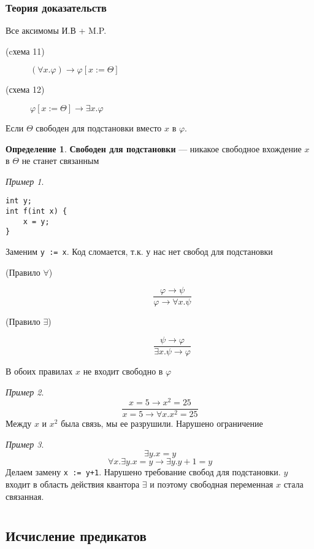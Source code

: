 \documentclass[oneside]{book}
\theoremstyle{plain}
\theoremstyle{remark}
\newtheorem*{examp}{Пример}
\theoremstyle{definition}
\newtheorem*{definition}{Определение}
\begin{document}
\subsection{Теория доказательств}
\label{sec:orgb12512f}
Все аксимомы И.В + M.P.
\begin{description}
\item[{(cхема 11)}] \((\forall x. \varphi) \to \varphi[x:=\Theta]\)
\item[{(схема 12)}] \(\varphi[x:=\Theta]\to \exists x. \varphi\)
\end{description}
Если \(\Theta\) свободен для подстановки вместо \(x\) в \(\varphi\).
\begin{definition}
\textbf{Свободен для подстановки} --- никакое свободное вхождение \(x\) в \(\Theta\) не станет связанным
\end{definition}
\begin{examp}
\-
\begin{verbatim}
int y;
int f(int x) {
	x = y;
}
\end{verbatim}
Заменим \texttt{y := x}. Код сломается, т.к. у нас нет свобод для подстановки
\end{examp}
\begin{description}
\item[{(Правило \(\forall\))}] \[\frac{\varphi \to \psi}{\varphi \to \forall x. \psi}\]
\item[{(Правило \(\exists\))}] \[ \frac{\psi \to \varphi}{\exists x.\psi \to \varphi} \]
\end{description}
В обоих правилах \(x\) не входит свободно в \(\varphi\)
\begin{examp}
\[ \frac{x = 5 \to x^2 = 25}{x = 5 \to \forall x. x^2 = 25} \]
Между \(x\) и \(x^2\) была связь, мы ее разрушили. Нарушено ограничение
\end{examp}
\begin{examp}
\[ \exists y. x = y \]
\[ \forall x. \exists y. x = y \to \exists y. y + 1 = y \]
Делаем замену \texttt{x := y+1}. Нарушено требование свобод для подстановки. \(y\) входит в область действия квантора \(\exists\) и поэтому свободная переменная \(x\) стала связанная.
\end{examp}
\chapter{}
\label{sec:org462c941}
\section{Исчисление предикатов}
\label{sec:org07a0556}
\end{document}
